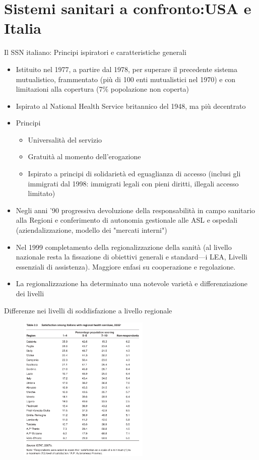 \documentclass[aspectratio=64,11pt]{beamer}
\begin{document}
\section{Sistemi sanitari a confronto:\newline USA e Italia}

\begin{frame}{Il SSN italiano: Principi ispiratori e caratteristiche generali}
\begin{itemize}
\item Istituito nel 1977, a partire dal 1978, per superare il precedente sistema
mutualistico, frammentato (più di 100 enti mutualistici nel 1970) e con
limitazioni alla copertura (7\% popolazione non coperta)
\item Ispirato al National Health Service britannico del 1948, ma più decentrato
\item Principi
\begin{itemize}
\item Universalità del servizio
\item Gratuità al momento dell'erogazione
\item Ispirato a principi di solidarietà ed eguaglianza di accesso (inclusi gli
immigrati dal 1998: immigrati legali con pieni diritti, illegali accesso limitato)
\end{itemize}
\item Negli anni '90 progressiva devoluzione della responsabilità in campo
sanitario alla Regioni e conferimento di autonomia gestionale alle ASL e
ospedali (aziendalizzazione, modello dei "mercati interni")
\item Nel 1999 completamento della regionalizzazione della sanità (al livello
nazionale resta la fissazione di obiettivi generali e standard---i LEA,
Livelli essenziali di assistenza). Maggiore enfasi su cooperazione e
regolazione.
\item La regionalizzazione ha determinato una notevole varietà e differenziazione
dei livelli
\end{itemize}
\end{frame}
\begin{frame}{Differenze nei livelli di soddisfazione a livello regionale}
\begin{figure}[htbp]
\centering
\includegraphics[height=7cm]{./figure/soddisfazione-sanita-italiana-regioni.pdf}
\end{figure}
\end{frame}
\end{document}
